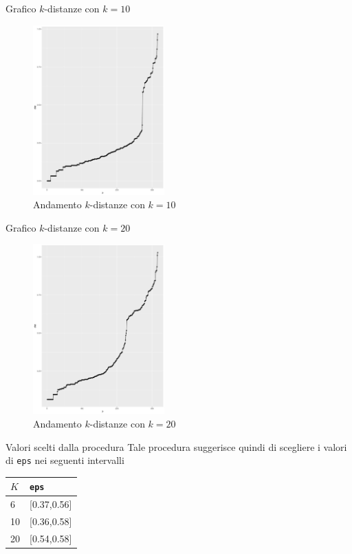 \documentclass{beamer}
\begin{document}
\begin{frame}{Grafico $k$-distanze con $k=10$}
  \begin{figure}[bt]
    \begin{center}
    \includegraphics[width = 0.45\textwidth]{../img/eps-minpts10.pdf}
    \caption{Andamento $k$-distanze con $k=10$}
    \end{center}
  \end{figure}
\end{frame}

\begin{frame}{Grafico $k$-distanze con $k=20$}
  \begin{figure}[bt]
    \begin{center}
    \includegraphics[width = 0.45\textwidth]{../img/eps-minpts20.pdf}
    \caption{Andamento $k$-distanze con $k=20$}
    \end{center}
  \end{figure}
\end{frame}

\begin{frame}{Valori scelti dalla procedura }
Tale procedura suggerisce quindi di scegliere i valori di \texttt{eps} nei seguenti intervalli
  \begin{table}[]
\begin{tabular}{|l|c|}
\hline
$K$  & \multicolumn{1}{l|}{\texttt{eps}} \\ \hline
6  & {[}0.37,0.56{]}          \\ \hline
10 & {[}0.36,0.58{]}          \\ \hline
20 & {[}0.54,0.58{]}          \\ \hline
\end{tabular}
\end{table}
\end{frame}
\end{document}
